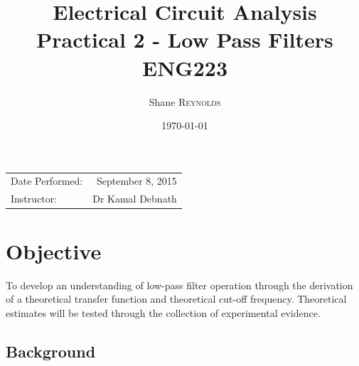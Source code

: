 \documentclass{article}
\title{Electrical Circuit Analysis \\ Practical 2 - Low Pass Filters \\ ENG223} %
\author{Shane \textsc{Reynolds}} %
\date{\today} %
\begin{document}
\maketitle %

\begin{center}
\begin{tabular}{l r}
Date Performed: & September 8, 2015 \\ %
Instructor: & Dr Kamal Debnath %
\end{tabular}
\end{center}



\section{Objective}

To develop an understanding of low-pass filter operation through the derivation of a theoretical transfer function and theoretical cut-off frequency. Theoretical estimates will be tested through the collection of experimental evidence.

\subsection{Background}
\label{definitions}
\end{document}
